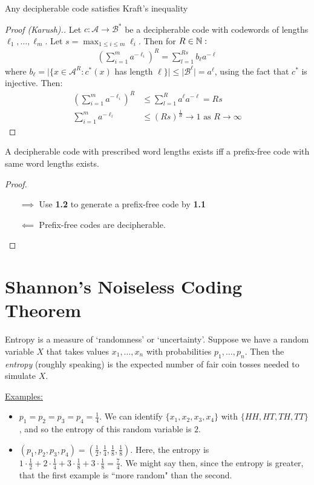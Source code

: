 \documentclass[10pt,a4paper]{article}
\begin{document}
\begin{theorem}[McMillan]
Any decipherable code satisfies Kraft's inequality
\end{theorem}
\begin{proof}[Proof (Karush).]
Let $c:\mathscr{A} \to \mathscr{B}^{\ast}$ be a decipherable code with codewords of lengths $\ell_1, \ldots, \ell_m$. Let $s = \max_{1 \leq i\leq m} \ell_i$. Then for $R \in \mathbb{N}:$
\begin{align*}
\left(\sum_{i=1}^{m} a^{-\ell_i}\right)^R = \sum_{l=1}^{Rs} b_{\ell}a^{-\ell}
\end{align*}
where $b_{\ell} = |\{x \in \mathscr{A}^R : c^{\ast}(x)$ has length $\ell\}| \leq |\mathscr{B}^{\ell}| = a^{\ell}$, using the fact that $c^{\ast}$ is injective. Then:
\begin{align*}
\left(\sum_{i=1}^m a^{-\ell_i}\right)^R &\leq \sum_{l=1}^R a^\ell a^{-\ell} = Rs\\
\sum_{i=1}^m a^{-\ell_i} &\leq (Rs)^{\frac1R} \to 1 \text{ as } R \to \infty
\end{align*}
\end{proof}

\begin{corollary}
A decipherable code with prescribed word lengths exists iff a prefix-free code with same word lengths exists.
\end{corollary}
\begin{proof}
\item
\begin{itemize}
\item[$\implies$] Use \textbf{1.2} to generate a prefix-free code by \textbf{1.1}
\item[$\impliedby$] Prefix-free codes are decipherable.
\end{itemize}
\end{proof}

\section{Shannon's Noiseless Coding Theorem}
Entropy is a measure of `randomness' or `uncertainty'. Suppose we have a random variable $X$ that takes values $x_1, \ldots, x_n$ with probabilities $p_1, \ldots, p_n$. Then the \emph{entropy} (roughly speaking) is the expected number of fair coin tosses needed to simulate $X$.

\hspace*{-1em}\underline{Examples:}
\begin{itemize}
\item $p_1 = p_2 = p_3 = p_4 = \frac14$. We can identify $\{x_1, x_2, x_3, x_4\}$ with $\{HH, HT, TH, TT\}$, and so the entropy of this random variable is $2$.

\item $(p_1, p_2, p_3, p_4)=(\frac12,\frac14,\frac18,\frac18)$. Here, the entropy is $1\cdot\frac12+2\cdot\frac14+3\cdot\frac18+3\cdot\frac18 = \frac74$. We might say then, since the entropy is greater, that the first example is ``more random" than the second.
\end{itemize}
\end{document}
